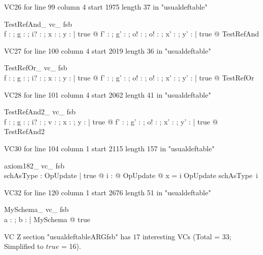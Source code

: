 \documentclass{article}
\begin{document}
VC26 for line 99 column 4 start 1975 length 37 in "usualdeftable"
\begin{theorem}{ TestRefAnd\_ vc\_ fsb}\\
 \forall f : \nat \pfun \nat ; g : \nat ; i? : \nat ; x : \nat ; y : \power \nat | true @ \exists f' : \nat \pfun \nat ; g' : \nat ; o! : \nat ; o! : \nat ; x' : \nat ; y' : \power \nat | true @ TestRefAnd \\

\end{theorem}

VC27 for line 100 column 4 start 2019 length 36 in "usualdeftable"
\begin{theorem}{ TestRefOr\_ vc\_ fsb}\\
 \forall f : \nat \pfun \nat ; g : \nat ; i? : \nat ; x : \nat ; y : \power \nat | true @ \exists f' : \nat \pfun \nat ; g' : \nat ; o! : \nat ; o! : \nat ; x' : \nat ; y' : \power \nat | true @ TestRefOr \\

\end{theorem}

VC28 for line 101 column 4 start 2062 length 41 in "usualdeftable"
\begin{theorem}{ TestRefAnd2\_ vc\_ fsb}\\
 \forall f : \nat \pfun \nat ; g : \nat ; i? : \nat ; v : \nat ; x : \nat ; y : \power \nat | true @ \exists f' : \nat \pfun \nat ; g' : \nat ; o! : \nat ; x' : \nat ; y' : \power \nat | true @ TestRefAnd2 \\

\end{theorem}

VC30 for line 104 column 1 start 2115 length 157 in "usualdeftable"
\begin{theorem}{ axiom182\_ vc\_ fsb}\\
 \exists schAsType : \nat \fun \power OpUpdate | true @ \forall i : \nat @ \exists OpUpdate @ x = i \land \theta OpUpdate \in schAsType~i \\

\end{theorem}

VC32 for line 120 column 1 start 2676 length 51 in "usualdeftable"
\begin{theorem}{ MySchema\_ vc\_ fsb}\\
 \exists a : \nat ; b : \nat | MySchema @ true \\

\end{theorem}



 VC Z section "usualdeftableARGfsb" has $17$ interesting VCs (Total = 33; Simplified to $true$ = 16).



\end{document}
